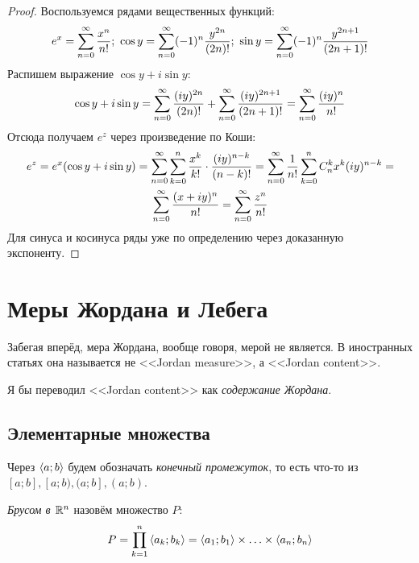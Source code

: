\begin{proof}
	Воспользуемся рядами вещественных функций:
	\[
		e^x = \sum_{n = 0}^\infty \frac{x^n}{n!};\ \cos y = \sum_{n = 0}^\infty (-1)^n \frac{y^{2n}}{(2n)!};\ \sin y = \sum_{n = 0}^\infty (-1)^n \frac{y^{2n + 1}}{(2n + 1)!}
	\]
	Распишем выражение $\cos y + i\sin y$:
	\[
		\cos y + i\sin y = \sum_{n = 0}^\infty \frac{(iy)^{2n}}{(2n)!} + \sum_{n = 0}^\infty \frac{(iy)^{2n + 1}}{(2n + 1)!} = \sum_{n = 0}^\infty \frac{(iy)^n}{n!}
	\]
	Отсюда получаем $e^z$ через произведение по Коши:
	\begin{multline*}
		e^z = e^x(\cos y + i\sin y) = \sum_{n = 0}^\infty \sum\limits_{k = 0}^n \frac{x^k}{k!} \cdot \frac{(iy)^{n - k}}{(n - k)!} = \sum_{n = 0}^\infty \frac{1}{n!}\sum\limits_{k = 0}^n C_n^k x^k (iy)^{n - k} =
		\\
		\sum_{n = 0}^\infty \frac{(x + iy)^n}{n!} = \sum_{n = 0}^\infty \frac{z^n}{n!}
	\end{multline*}
	Для синуса и косинуса ряды уже по определению через доказанную экспоненту.
\end{proof}

\section{Меры Жордана и Лебега}

\begin{note}
	Забегая вперёд, мера Жордана, вообще говоря, мерой не является. В иностранных статьях она называется не <<Jordan measure>>, а <<Jordan content>>.
\end{note}

\begin{anote}
	Я бы переводил <<Jordan content>> как \textit{содержание Жордана}.
\end{anote}

\subsection{Элементарные множества}

\begin{note}
	Через $\left\langle a; b\right\rangle$ будем обозначать \textit{конечный промежуток}, то есть что-то из $[a; b], [a; b), (a; b], (a; b)$.
\end{note}

\begin{definition}
	\textit{Брусом в $\mathbb{R}^n$} назовём множество $P$:
	\[
		P = \prod\limits_{k = 1}^n \left\langle a_k; b_k\right\rangle = \left\langle a_1; b_1\right\rangle \times \ldots \times \left\langle a_n; b_n\right\rangle
	\]
\end{definition}


